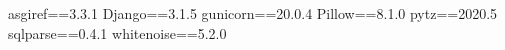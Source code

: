 asgiref==3.3.1
Django==3.1.5
gunicorn==20.0.4
Pillow==8.1.0
pytz==2020.5
sqlparse==0.4.1
whitenoise==5.2.0
